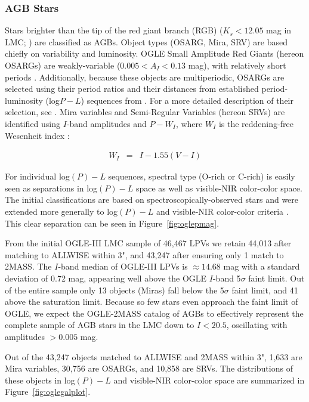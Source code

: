 \subsubsection{AGB Stars}
Stars brighter than the tip of the red giant branch (RGB) ($K_s < 12.05$ mag in LMC; \citealt{2004AcA....54..129S, 2007AcA....57..201S}) are classified as AGBs. Object types (OSARG, Mira, SRV) are based chiefly on variability and luminosity. OGLE Small Amplitude Red Giants (hereon OSARGs) are weakly-variable ($0.005 < A_I < 0.13$ mag), with relatively short periods \citep[$10 < P < 100$ days;][]{2004AcA....54..129S}. Additionally, because these objects are multiperiodic, OSARGs are selected using their period ratios and their distances from established period-luminosity (log$P-L$) sequences from \cite{1999IAUS..191..151W}. For a more detailed description of their selection, see \cite{2007AcA....57..201S}. Mira variables and Semi-Regular Variables (hereon SRVs) are identified using $I$-band amplitudes and $P-W_I$, where $W_I$ is the reddening-free Wesenheit index \citep{2005AcA....55..331S}:

\begin{eqnarray}
W_I &=& I - 1.55(V-I)
\end{eqnarray}

For individual log$(P)-L$ sequences, spectral type (O-rich or C-rich) is easily seen as separations in log$(P)-L$ space as well as visible-NIR color-color space. The initial classifications are based on spectroscopically-observed stars and were extended more generally to log$(P)-L$ and visible-NIR color-color criteria \citep{2005AcA....55..331S, 2007AcA....57..201S}. This clear separation can be seen in Figure~\ref{fig:oglepmag}.

From the initial OGLE-III LMC sample of 46,467 LPVs we retain 44,013 after matching to ALLWISE within 3", and 43,247 after ensuring only 1 match to 2MASS. The $I$-band median of OGLE-III LPVs is $\approx14.68$ mag with a standard deviation of 0.72 mag, appearing well above the OGLE $I$-band 5$\sigma$ faint limit. Out of the entire sample only 13 objects (Miras) fall below the 5$\sigma$ faint limit, and 41 above the saturation limit. Because so few stars even approach the faint limit of OGLE, we expect the OGLE-2MASS catalog of AGBs to effectively represent the complete sample of AGB stars in the LMC down to $I < 20.5$, oscillating with amplitudes $> 0.005$ mag.

Out of the 43,247 objects matched to ALLWISE and 2MASS within 3", 1,633 are Mira variables, 30,756 are OSARGs, and 10,858 are SRVs. %
The distributions of these objects in log$(P)-L$ and visible-NIR color-color space are summarized in Figure~\ref{fig:oglegalplot}.

